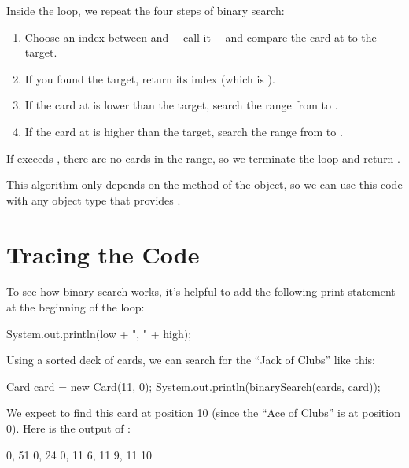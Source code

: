 Inside the  loop, we repeat the four steps of binary search:

\begin{enumerate}

\item Choose an index between  and ---call it ---and compare the card at  to the target.

\item If you found the target, return its index (which is ).

\item If the card at  is lower than the target, search the range from  to .

\item If the card at  is higher than the target, search the range from  to .

\end{enumerate}

If  exceeds , there are no cards in the range, so we terminate the loop and return .

This algorithm only depends on the  method of the object, so we can use this code with any object type that provides .


\section{Tracing the Code}


To see how binary search works, it's helpful to add the following print statement at the beginning of the loop:

\begin{code}
System.out.println(low + ", " + high);
\end{code}

Using a sorted deck of cards, we can search for the ``Jack of Clubs'' like this:

\begin{code}
Card card = new Card(11, 0);
System.out.println(binarySearch(cards, card));
\end{code}

We expect to find this card at position 10 (since the ``Ace of Clubs'' is at position 0).
Here is the output of :

\begin{stdout}
0, 51
0, 24
0, 11
6, 11
9, 11
10
\end{stdout}

